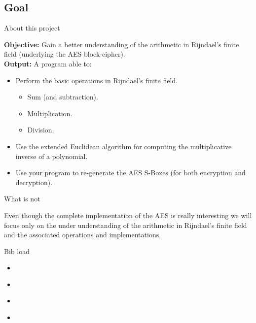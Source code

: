 \subsection{Goal}

\begin{frame}[t]{About this project}

\textbf{Objective:} Gain a better understanding of the arithmetic in Rijndael's finite field (underlying the AES block-cipher). \\

\textbf{Output:} A program able to:
	\begin{itemize}
		\item Perform the basic operations in Rijndael's finite field.
			\begin{itemize}
				\item Sum (and subtraction).
				\item Multiplication.
				\item Division.
			\end{itemize}
		\item Use the extended Euclidean algorithm \cite{Menezes2012handbook} for computing the multiplicative inverse of a polynomial.
		
		\item Use your program to re-generate the AES S-Boxes (for both encryption and decryption).
		
	\end{itemize}
\end{frame}

\begin{frame}[t]{What is not}
	
	Even though the complete implementation of the AES is really interesting we will focus only on the under understanding of the arithmetic in Rijndael's finite field and the associated operations and implementations.
\end{frame}

\begin{frame}[t]{Bib load}
	\begin{itemize}
		\item \cite{Menezes2012handbook}
		\item \cite{Venturi2012crittografia}
		\item \cite{Katz2014modern}
		\item \cite{Rijndael2020design}
	\end{itemize}
\end{frame}